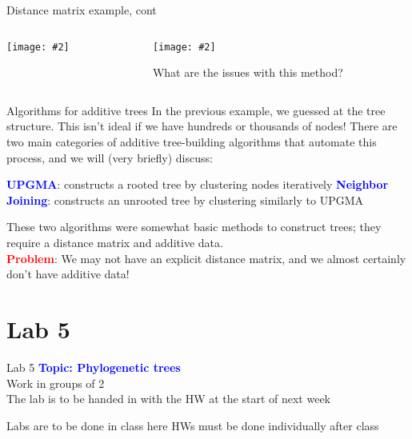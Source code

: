 \documentclass{beamer}
\renewcommand{\c}[1]{\begin{center}#1\end{center}}
\newcommand{\blu}[1]{\textcolor{blue}{\textbf{#1}}}
\newcommand{\red}[1]{\textcolor{red}{\textbf{#1}}}
\newcommand{\gr}[2][.95]{\c{\texttt{[image: \#2]}}}
\begin{document}
\begin{frame}{Distance matrix example, cont}
    \begin{columns}
        \begin{column}{0.5\textwidth}
            \gr{l5_figs/s19_dist_matrix.png}
        \end{column}
        \begin{column}{0.5\textwidth}
            \gr{l5_figs/s23_tree3.png}
            What are the issues with this method?
        \end{column}
    \end{columns}
\end{frame}

\begin{frame}{Algorithms for additive trees}
    In the previous example, we guessed at the tree structure. This isn’t ideal if we have hundreds or thousands of nodes! There are two main categories of additive tree-building algorithms that automate this process, and we will (very briefly) discuss:
    \begin{outline}
        \1 \blu{UPGMA}: constructs a rooted tree by clustering nodes iteratively
        \1 \blu{Neighbor Joining}: constructs an unrooted tree by clustering similarly to UPGMA
    \end{outline}
    These two algorithms were somewhat basic methods to construct trees; they require a distance matrix and additive data.\\
    \bigskip
    \red{Problem}: We may not have an explicit distance matrix, and we almost certainly don’t have additive data!
\end{frame}




\section{Lab 5}
\begin{frame}{Lab 5}
    \blu{Topic: Phylogenetic trees}\\
    \bigskip
    Work in groups of 2\\
    \bigskip
    The lab is to be handed in with the HW at the start of next week
    \begin{outline}
        \1 Labs are to be done in class here
        \1 HWs must be done individually after class
    \end{outline}
\end{frame}
\end{document}
